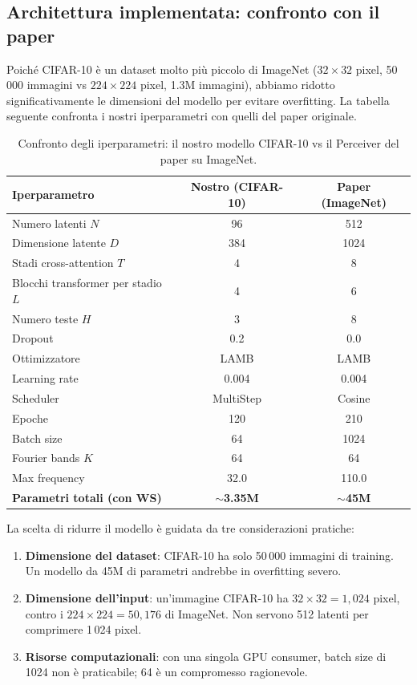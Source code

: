 \documentclass[12pt,a4paper]{article}
\begin{document}
\subsection{Architettura implementata: confronto con il paper} \label{sec:arch_confronto}

Poich\'e CIFAR-10 \`e un dataset molto pi\`u piccolo di ImageNet ($32 \times 32$ pixel, 50\,000 immagini vs $224 \times 224$ pixel, 1.3M immagini), abbiamo ridotto significativamente le dimensioni del modello per evitare overfitting. La tabella seguente confronta i nostri iperparametri con quelli del paper originale.

\begin{table}[htbp]
\centering
\caption{Confronto degli iperparametri: il nostro modello CIFAR-10 vs il Perceiver del paper su ImageNet.}
\label{tab:iperparametri_confronto}
\begin{tabular}{@{}lcc@{}}
\toprule
\textbf{Iperparametro} & \textbf{Nostro (CIFAR-10)} & \textbf{Paper (ImageNet)} \\
\midrule
Numero latenti $N$ & 96 & 512 \\
Dimensione latente $D$ & 384 & 1024 \\
Stadi cross-attention $T$ & 4 & 8 \\
Blocchi transformer per stadio $L$ & 4 & 6 \\
Numero teste $H$ & 3 & 8 \\
Dropout & 0.2 & 0.0 \\
Ottimizzatore & LAMB & LAMB \\
Learning rate & 0.004 & 0.004 \\
Scheduler & MultiStep & Cosine \\
Epoche & 120 & 210 \\
Batch size & 64 & 1024 \\
Fourier bands $K$ & 64 & 64 \\
Max frequency & 32.0 & 110.0 \\
\midrule
\textbf{Parametri totali (con WS)} & \textbf{$\sim$3.35M} & \textbf{$\sim$45M} \\
\bottomrule
\end{tabular}
\end{table}

\begin{notabox}
La scelta di ridurre il modello \`e guidata da tre considerazioni pratiche:
\begin{enumerate}[label=(\roman*)]
    \item \textbf{Dimensione del dataset}: CIFAR-10 ha solo 50\,000 immagini di training. Un modello da 45M di parametri andrebbe in overfitting severo.
    \item \textbf{Dimensione dell'input}: un'immagine CIFAR-10 ha $32 \times 32 = 1{,}024$ pixel, contro i $224 \times 224 = 50{,}176$ di ImageNet. Non servono 512 latenti per comprimere 1\,024 pixel.
    \item \textbf{Risorse computazionali}: con una singola GPU consumer, batch size di 1024 non \`e praticabile; 64 \`e un compromesso ragionevole.
\end{enumerate}
\end{notabox}
\end{document}
